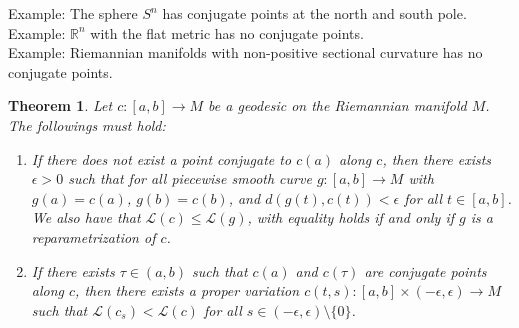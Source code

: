 \documentclass[11pt]{book}
\theoremstyle{break}
\theoremstyle{break}
\newtheorem{thm}{Theorem}[section]
\newcommand{\R}{\mathbb{R}}
\newcommand{\example}{\color{green}Example: \color{black}}
\begin{document}
\example The sphere $S^n$ has conjugate points at the north and south pole.\\

\example $\R^n$ with the flat metric has no conjugate points.\\

\example Riemannian manifolds with non-positive sectional curvature has no conjugate points.


\begin{thm}
Let $c:[a,b] \to M$ be a geodesic on the Riemannian manifold $M$. The followings must hold:
\begin{enumerate}
\item If there does not exist a point conjugate to $c(a)$ along $c$, then there exists $\epsilon>0$ such that for all piecewise smooth curve $g:[a,b]\to M$ with $g(a) = c(a)$, $g(b) = c(b)$, and $d(g(t),c(t)) < \epsilon$ for all $t \in [a,b]$. We also have that $\mathcal{L}(c) \leq \mathcal{L}(g)$, with equality holds if and only if $g$ is a reparametrization of $c$. 
\item If there exists $\tau \in (a,b)$ such that $c(a)$ and $c(\tau)$ are conjugate points along $c$, then there exists a proper variation $c(t,s) :[a,b]\times (-\epsilon,\epsilon) \to M$ such that $\mathcal{L}(c_s) < \mathcal{L}(c)$ for all $s \in (-\epsilon,\epsilon) \setminus \{0\}$.  
\end{enumerate}
\end{thm}
\end{document}
